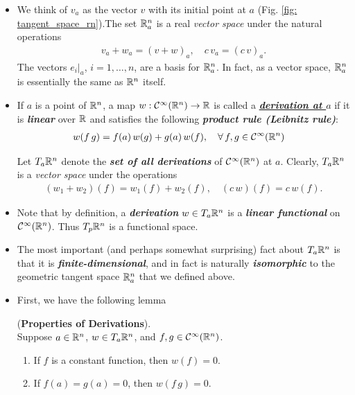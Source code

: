 \documentclass[11pt]{article}
\begin{document}
\begin{itemize}
\item We think of $v_a$ as the vector $v$ with its initial point at $a$ (Fig. \ref{fig: tangent_space_rn}).The set ${\mathbb R}_{a}^n$ is a real \emph{vector space} under the natural operations
\begin{align*}
v_a + w_a = (v + w)_a, \quad c\,v_a = (c\,v)_a.
\end{align*} The vectors $e_i|_a$, $i = 1,\ldots,n$, are a basis for ${\mathbb R}_{a}^n$. In fact, as a vector space, ${\mathbb R}_{a}^n$ is essentially the same as ${\mathbb R}^n$ itself.

\item \begin{definition}
If $a$ is a point of ${\mathbb R}^n$, a map $w: {\mathcal C}^{\infty}({\mathbb R}^n) \rightarrow {\mathbb R}$ is called a \underline{\emph{\textbf{derivation at $a$}}} if it is \emph{\textbf{linear}} over ${\mathbb R}$ and satisfies the following \emph{\textbf{product rule (Leibnitz rule)}}:
\begin{align}
w(f\,g) &= f(a)\,w(g) + g(a)\,w(f), \quad  \forall\,f,g \in {\mathcal C}^{\infty}({\mathbb R}^{n})  \label{eqn: derivation_def}
\end{align}
\end{definition}

Let $T_{a}{\mathbb R}^n$ denote the \emph{\textbf{set of all derivations}} of ${\mathcal C}^{\infty}({\mathbb R}^n)$ at $a$. Clearly, $T_{a}{\mathbb R}^n$  is a
\emph{vector space} under the operations
\begin{align*}
(w_1 + w_2)(f)  = w_1(f) + w_2(f), \quad (c\,w)(f) = c\,w(f).
\end{align*}

\item Note that by definition, a \emph{\textbf{derivation}} $w \in T_{a}{\mathbb R}^n$ is a \emph{\textbf{linear functional}} on ${\mathcal C}^{\infty}({\mathbb R}^n)$. Thus $T_{p}{\mathbb R}^{n}$ is a functional space.

\item The most important (and perhaps somewhat surprising) fact about $T_{a}{\mathbb R}^n$ is that it is \emph{\textbf{finite-dimensional}}, and in fact is naturally \emph{\textbf{isomorphic}} to the geometric tangent space ${\mathbb R}_{a}^n$ that we defined above.

\item First, we have the following lemma
\begin{lemma} (\textbf{Properties of Derivations}).\\
Suppose $a \in {\mathbb R}^n$, $w \in T_{a}{\mathbb R}^n$, and $f, g \in {\mathcal C}^{\infty}({\mathbb R}^n)$.
\begin{enumerate}
\item If $f$ is a constant function, then $w(f) = 0$. 
\item If $f(a) = g(a) = 0$, then $w(f\,g) = 0$.
\end{enumerate}
\end{lemma}


\end{itemize}
\end{document}
